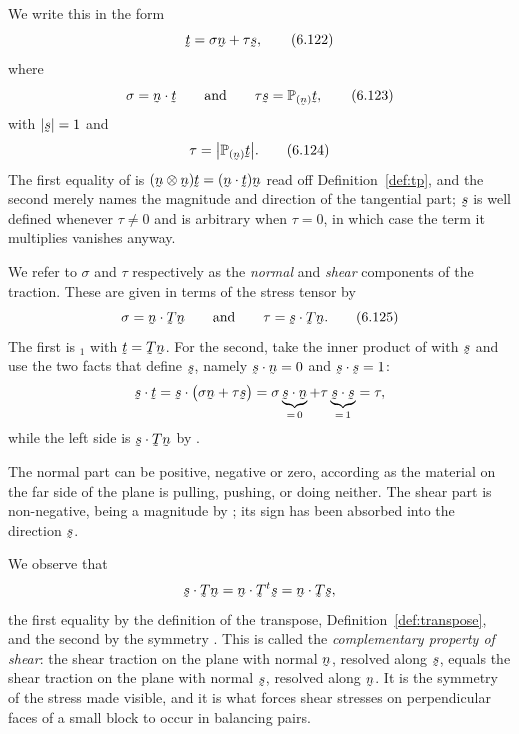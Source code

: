 We write this in the form
\begin{equation}
   \bt=\sigma\bn+\tau\bs ,
   \tag{6.122}\label{eq:6.122}
\end{equation}
where
\begin{equation}
   \sigma=\ip\bn\bt
   \qquad\text{and}\qquad
   \tau\bs=\Proj\bn\bt ,
   \tag{6.123}\label{eq:6.123}
\end{equation}
with $|\bs|=1$ and
\begin{equation}
   \tau=\big|\Proj\bn\bt\big| .
   \tag{6.124}\label{eq:6.124}
\end{equation}
The first equality of  is $(\bn\otimes\bn)\bt
=(\ip\bn\bt)\bn$ read off Definition~\ref{def:tp}, and the second
merely names the magnitude and direction of the tangential part; $\bs$
is well defined whenever $\tau\neq0$ and is arbitrary when $\tau=0$,
in which case the term it multiplies vanishes anyway.

We refer to $\sigma$ and $\tau$ respectively as the \emph{normal} and
\emph{shear} components of the traction. These are given in terms of
the stress tensor by
\begin{equation}
   \sigma=\ip\bn{\bT\bn}
   \qquad\text{and}\qquad
   \tau=\ip\bs{\bT\bn} .
   \tag{6.125}\label{eq:6.125}
\end{equation}
The first is $_{1}$ with $\bt=\bT\bn$. For the second, take
the inner product of  with $\bs$ and use the two facts that
define $\bs$, namely $\ip\bs\bn=0$ and $\ip\bs\bs=1$:
\[
   \ip\bs\bt
   =\ip\bs{\big(\sigma\bn+\tau\bs\big)}
   =\sigma\underbrace{\ip\bs\bn}_{=\,0}
    +\tau\underbrace{\ip\bs\bs}_{=\,1}
   =\tau ,
\]
while the left side is $\ip\bs{\bT\bn}$ by .

The normal part can be positive, negative or zero, according as the
material on the far side of the plane is pulling, pushing, or doing
neither. The shear part is non-negative, being a magnitude by
; its sign has been absorbed into the direction $\bs$.

We observe that
\[
   \ip\bs{\bT\bn}=\ip\bn{\bT^{t}\bs}=\ip\bn{\bT\bs},
\]
the first equality by the definition of the transpose,
Definition~\ref{def:transpose}, and the second by the symmetry
. This is called the \emph{complementary property of shear}:
the shear traction on the plane with normal $\bn$, resolved along
$\bs$, equals the shear traction on the plane with normal $\bs$,
resolved along $\bn$. It is the symmetry of the stress made visible,
and it is what forces shear stresses on perpendicular faces of a small
block to occur in balancing pairs.

